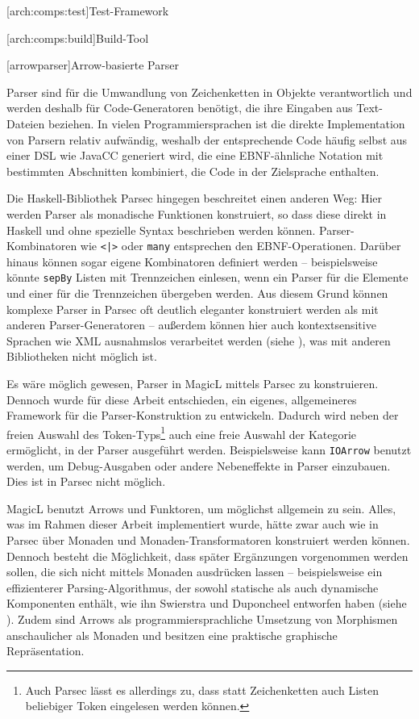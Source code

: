 \documentclass[12pt, a4paper, bibgerm]{scrbook}
\newcommand\icode[1]{\lstinline?#1?}
\newcommand\lchapter{}
\newcommand\lsubsection{}
\begin{document}
\lsubsection[arch:comps:test]{Test-Framework}

\lsubsection[arch:comps:build]{Build-Tool}

\lchapter[arrowparser]{Arrow-basierte Parser}

Parser sind für die Umwandlung von Zeichenketten in Objekte
verantwortlich und werden deshalb für Code-Generatoren benötigt, die
ihre Eingaben aus Text-Dateien beziehen. In vielen Programmiersprachen
ist die direkte Implementation von Parsern relativ aufwändig, weshalb
der entsprechende Code häufig selbst aus einer DSL wie JavaCC
generiert wird, die eine EBNF-ähnliche Notation mit bestimmten
Abschnitten kombiniert, die Code in der Zielsprache enthalten.

Die Haskell-Bibliothek Parsec \cite{Parsec} hingegen beschreitet einen
anderen Weg: Hier werden Parser als monadische Funktionen konstruiert,
so dass diese direkt in Haskell und ohne spezielle Syntax beschrieben
werden können. Parser-Kombinatoren wie \icode{<|>} oder \icode{many}
entsprechen den EBNF-Operationen. Darüber hinaus können sogar eigene
Kombinatoren definiert werden -- beispielsweise könnte \icode{sepBy}
Listen mit Trennzeichen einlesen, wenn ein Parser für die Elemente und
einer für die Trennzeichen übergeben werden. Aus diesem Grund können
komplexe Parser in Parsec oft deutlich eleganter konstruiert werden als
mit anderen Parser-Generatoren -- außerdem können hier auch
kontextsensitive Sprachen wie XML ausnahmslos verarbeitet werden (siehe
\cite[S. 3]{Parsec}), was mit anderen Bibliotheken nicht möglich ist.

Es wäre möglich gewesen, Parser in MagicL mittels Parsec zu
konstruieren. Dennoch wurde für diese Arbeit entschieden, ein eigenes,
allgemeineres Framework für die Parser-Konstruktion zu
entwickeln. Dadurch wird neben der freien Auswahl des
Token-Typs\footnote{Auch Parsec lässt es allerdings zu, dass statt
  Zeichenketten auch Listen beliebiger Token eingelesen werden können.}
auch eine freie Auswahl der Kategorie ermöglicht, in der Parser
ausgeführt werden. Beispielsweise kann \icode{IOArrow} benutzt werden,
um Debug-Ausgaben oder andere Nebeneffekte in Parser einzubauen. Dies
ist in Parsec nicht möglich.

MagicL benutzt Arrows und Funktoren, um möglichst allgemein zu
sein. Alles, was im Rahmen dieser Arbeit implementiert wurde, hätte zwar
auch wie in Parsec über Monaden und Monaden-Transformatoren konstruiert
werden können. Dennoch besteht die Möglichkeit, dass später Ergänzungen
vorgenommen werden sollen, die sich nicht mittels Monaden ausdrücken
lassen -- beispielsweise ein effizienterer Parsing-Algorithmus, der
sowohl statische als auch dynamische Komponenten enthält, wie ihn
Swierstra und Duponcheel entworfen haben (siehe
\cite[S. 8ff]{Hughes}). Zudem sind Arrows als programmiersprachliche
Umsetzung von Morphismen anschaulicher als Monaden und besitzen eine
praktische graphische Repräsentation.
\end{document}
